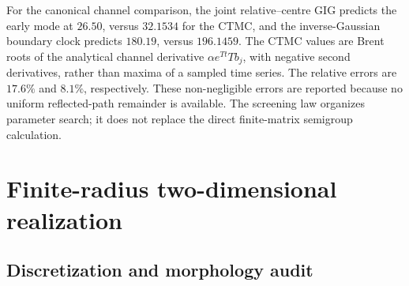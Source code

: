 \documentclass[aps,pre,reprint,amsmath,amssymb,longbibliography,floatfix]{revtex4-2}
\begin{document}
For the canonical channel comparison, the joint relative--centre GIG predicts
the early mode at \(26.50\), versus \(32.1534\) for the CTMC, and the
inverse-Gaussian boundary clock predicts \(180.19\), versus \(196.1459\).
The CTMC values are Brent roots of the analytical channel derivative
\(\alpha e^{Tt}Tb_j\), with negative second derivatives, rather than maxima
of a sampled time series.  The relative errors are \(17.6\%\) and \(8.1\%\),
respectively. These
non-negligible errors are reported because no uniform reflected-path
remainder is available. The screening law organizes parameter search; it
does not replace the direct finite-matrix semigroup calculation.

\section{Finite-radius two-dimensional realization}
\label{sec:two-dimensional}

\subsection{Discretization and morphology audit}
\label{sec:2d-method}
\end{document}

